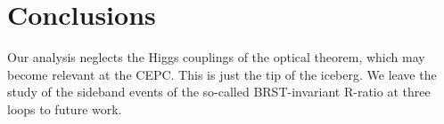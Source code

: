 \section{Conclusions}\label{sec:conclusions}

Our analysis neglects the Higgs couplings of the optical theorem, which
may become relevant at the CEPC. This is just the tip of the iceberg. We
leave the study of the sideband events of the so-called BRST-invariant
R-ratio at three loops to future work.

